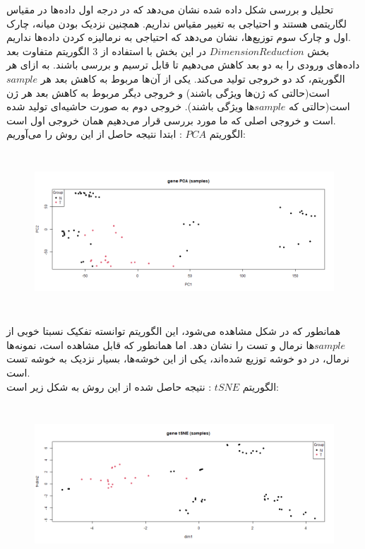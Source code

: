 \documentclass[a4paper,12pt]{article}
\begin{document}
تحلیل و بررسی شکل داده شده نشان می‌دهد که در درجه اول داده‌ها در مقیاس لگاریتمی هستند و احتیاجی به تغییر مقیاس نداریم. همچنین نزدیک بودن میانه، چارک اول و چارک سوم توزیع‌ها، نشان می‌دهد که احتیاجی به نرمالیزه کردن داده‌ها نداریم.\\
بخش
$Dimension Reduction$
در این بخش با استفاده از 3 الگوریتم متفاوت بعد داده‌های ورودی را به دو بعد کاهش می‌دهیم تا قابل ترسیم و بررسی باشند. به ازای هر الگوریتم، کد دو خروجی تولید می‌کند. یکی از آن‌ها مربوط به کاهش بعد هر $sample$ است(حالتی که ژ‌ن‌ها ویژگی باشند) و خروجی دیگر مربوط به کاهش بعد هر ژن است(حالتی که $sample$ها ویژگی باشند). خروجی دوم به صورت حاشیه‌ای تولید شده است و خروجی اصلی که ما مورد بررسی قرار می‌دهیم همان خروجی اول است.\\
الگوریتم $PCA$ : ابتدا نتیجه حاصل از این روش را می‌آوریم:
\begin{figure}[H]
 \centering
  \includegraphics[width=\linewidth , height=6cm]{../../results/pca_samples.png}
\end{figure}
همانطور که در شکل مشاهده می‌شود، این الگوریتم توانسته تفکیک نسبتا خوبی از $sample$ها نرمال و تست را نشان دهد. اما همانطور که قابل مشاهده است، نمونه‌ها نرمال، در دو خوشه توزیع شده‌اند، یکی از این خوشه‌ها، بسیار نزدیک به خوشه تست است.\\
الگوریتم $tSNE$ : نتیجه حاصل شده از این روش به شکل زیر است:
\begin{figure}[H]
 \centering
  \includegraphics[width=\linewidth , height=6cm]{../../results/tsne_samples.png}
\end{figure}
\end{document}
